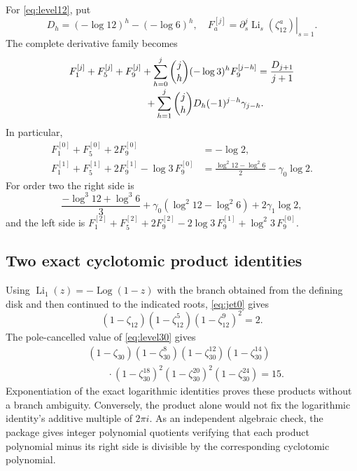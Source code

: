 \documentclass[11pt]{article}
\numberwithin{equation}{section}
\theoremstyle{definition}
\theoremstyle{remark}
\DeclareMathOperator{\Li}{Li}
\DeclareMathOperator{\Log}{Log}
\begin{document}
For \eqref{eq:level12}, put
\[
 D_h=(-\log12)^h-(-\log6)^h,
 \quad F_a^{[j]}=\left.\partial_s^j\Li_s(\zeta_{12}^a)\right|_{s=1}.
\]
The complete derivative family becomes
\begin{align}
 F_1^{[j]}+F_5^{[j]}+F_9^{[j]}
 +\sum_{h=0}^{j}\binom jh(-\log3)^hF_9^{[j-h]}
 ={}&\frac{D_{j+1}}{j+1}\notag\\[-3pt]
 &\hspace{-45mm}+\sum_{h=1}^{j}\binom jhD_h(-1)^{j-h}\gamma_{j-h}.
 \label{eq:level12-jets}
\end{align}
In particular,
\begin{align}
 F_1^{[0]}+F_5^{[0]}+2F_9^{[0]}&=-\log2,\label{eq:jet0}\\
 F_1^{[1]}+F_5^{[1]}+2F_9^{[1]}-\log3\,F_9^{[0]}
 &=\frac{\log^2 12-\log^2 6}{2}-\gamma_0\log2.
 \label{eq:jet1}
\end{align}
For order two the right side is
\[
 \frac{-\log^3 12+\log^3 6}{3}
 +\gamma_0(\log^2 12-\log^2 6)+2\gamma_1\log2,
\]
and the left side is
$F_1^{[2]}+F_5^{[2]}+2F_9^{[2]}-2\log3\,F_9^{[1]}
+\log^2 3\,F_9^{[0]}$.

\subsection{Two exact cyclotomic product identities}
Using $\Li_1(z)=-\Log(1-z)$ with the branch obtained from the defining
disk and then continued to the indicated roots, \eqref{eq:jet0} gives
\begin{equation}
 (1-\zeta_{12})(1-\zeta_{12}^{5})(1-\zeta_{12}^{9})^2=2.
 \label{eq:product12}
\end{equation}
The pole-cancelled value of \eqref{eq:level30} gives
\begin{equation}
 \begin{aligned}
 &(1-\zeta_{30})(1-\zeta_{30}^{8})(1-\zeta_{30}^{12})
 (1-\zeta_{30}^{14})\\
 &\qquad\cdot(1-\zeta_{30}^{18})^2(1-\zeta_{30}^{20})^2
 (1-\zeta_{30}^{24})=15.
 \end{aligned}
 \label{eq:product30}
\end{equation}
Exponentiation of the exact logarithmic identities proves these products
without a branch ambiguity. Conversely, the product alone would not
fix the logarithmic identity's additive multiple of $2\pi i$.
As an independent algebraic check, the package gives integer polynomial
quotients verifying that each product polynomial minus its right side
is divisible by the corresponding cyclotomic polynomial.
\end{document}
